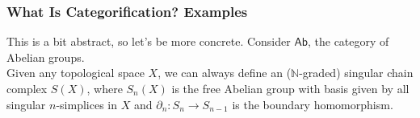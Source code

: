 \documentclass{beamer}
\newcommand{\textcat}[1]{\mathrm{\textsf{#1}}}
\begin{document}
\begin{frame}
\frametitle{What Is Categorification? Examples}
This is a bit abstract, so let's be more concrete. Consider $\textcat{Ab}$, the category of Abelian groups.\\[2ex]
Given any topological space $X$, we can always define an ($\mathbb{N}$-graded) singular chain complex $S(X)$, where $S_n(X)$ is the free Abelian group with basis given by all singular $n$-simplices in $X$ and $\partial_n : S_n \to S_{n-1}$ is the boundary homomorphism.
\end{frame}
\end{document}
